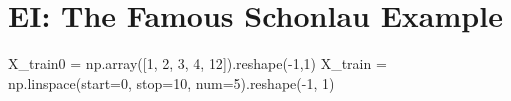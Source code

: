 \documentclass[
  letterpaper,
  DIV=11,
  numbers=noendperiod]{scrreprt}
\newenvironment{Shaded}{\begin{snugshade}}{\end{snugshade}}
\newcommand{\DecValTok}[1]{\textcolor[rgb]{0.68,0.00,0.00}{#1}}
\newcommand{\NormalTok}[1]{\textcolor[rgb]{0.00,0.23,0.31}{#1}}
\newcommand{\OperatorTok}[1]{\textcolor[rgb]{0.37,0.37,0.37}{#1}}
\begin{document}
\hypertarget{ei-the-famous-schonlau-example}{%
\section{EI: The Famous Schonlau
Example}\label{ei-the-famous-schonlau-example}}

\begin{Shaded}
\begin{Highlighting}[]
\NormalTok{X\_train0 }\OperatorTok{=}\NormalTok{ np.array([}\DecValTok{1}\NormalTok{, }\DecValTok{2}\NormalTok{, }\DecValTok{3}\NormalTok{, }\DecValTok{4}\NormalTok{, }\DecValTok{12}\NormalTok{]).reshape(}\OperatorTok{{-}}\DecValTok{1}\NormalTok{,}\DecValTok{1}\NormalTok{)}
\NormalTok{X\_train }\OperatorTok{=}\NormalTok{ np.linspace(start}\OperatorTok{=}\DecValTok{0}\NormalTok{, stop}\OperatorTok{=}\DecValTok{10}\NormalTok{, num}\OperatorTok{=}\DecValTok{5}\NormalTok{).reshape(}\OperatorTok{{-}}\DecValTok{1}\NormalTok{, }\DecValTok{1}\NormalTok{)}
\end{Highlighting}
\end{Shaded}
\end{document}

